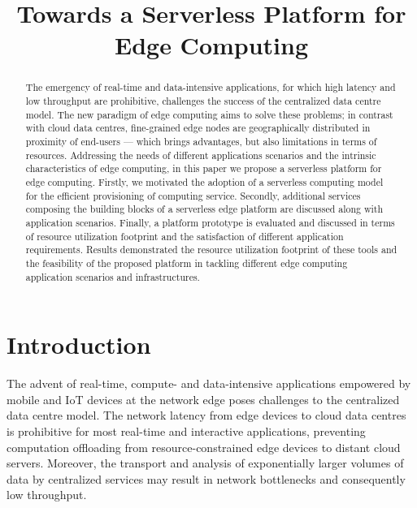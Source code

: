 \documentclass[letterpaper, 10 pt, conference]{ieeeconf}  %
\title{\LARGE \bf
Towards a Serverless Platform for Edge Computing
}
\author{\IEEEauthorblockN{Luciano Baresi and
Danilo Filgueira Mendonça}
\IEEEauthorblockA{Politecnico di Milano\\
Milano, Italy}}
\begin{document}
\maketitle
\thispagestyle{empty}
\pagestyle{empty}


\begin{abstract}

The emergency of real-time and data-intensive applications, for which high latency and low throughput are prohibitive, challenges the success of the centralized data centre model. The new paradigm of edge computing aims to solve these problems; in contrast with cloud data centres, fine-grained edge nodes are geographically distributed in proximity of end-users --- which brings advantages, but also limitations in terms of resources. 
Addressing the needs of different applications scenarios and the intrinsic characteristics of edge computing, in this paper we propose a serverless platform for edge computing. Firstly, we motivated the adoption of a serverless computing model for the efficient provisioning of computing service. Secondly, additional services composing the building blocks of a serverless edge platform are discussed along with application scenarios. Finally, a platform prototype is evaluated and discussed in terms of resource utilization footprint and the satisfaction of different application requirements. 
Results demonstrated the resource utilization footprint of these tools and the feasibility of the proposed platform in tackling different edge computing application scenarios and infrastructures.



\end{abstract}


\section{Introduction}

The advent of real-time, compute- and data-intensive applications empowered by mobile and IoT devices at the network edge poses challenges to the centralized data centre model. The network latency from edge devices to cloud data centres is prohibitive for most real-time and interactive applications, preventing computation offloading from resource-constrained edge devices to distant cloud servers. Moreover, the transport and analysis of exponentially larger volumes of data by centralized services may result in network bottlenecks and consequently low throughput. 
\end{document}
